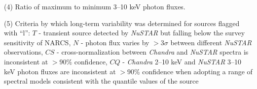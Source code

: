 \documentclass[iop,revtex4]{emulateapj}
\begin{document}
\begin{landscape}
\begin{table}
\begin{minipage}{0.8\linewidth}
\begin{threeparttable}
\begin{tablenotes}[flushleft]
\item (4) Ratio of maximum to minimum 3--10 keV photon fluxes.  
\item (5) Criteria by which long-term variability was determined for sources flagged with ``l'': $T$ - transient source detected by \textit{NuSTAR} but falling below the survey sensitivity of NARCS, $N$ - photon flux varies by $>3\sigma$ between different \textit{NuSTAR} observations, $CS$ - cross-normalization between \textit{Chandra} and \textit{NuSTAR} spectra is inconsistent at $>90$\% confidence, $CQ$ - \textit{Chandra} 2--10 keV and \textit{NuSTAR} 3--10 keV photon fluxes are inconsistent at $>90$\% confidence when adopting a range of spectral models consistent with the quantile values of the source
\end{tablenotes}
\label{tab:var}
\end{threeparttable}
\end{minipage}
\end{table}


\end{landscape}
\end{document}
